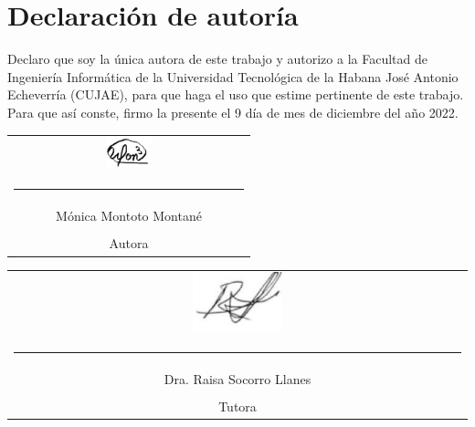 \chapter*{Declaración de autoría}

Declaro que soy la única autora de este trabajo y autorizo a la Facultad de Ingeniería Informática de la Universidad Tecnológica de la Habana José Antonio Echeverría (CUJAE), para que haga el uso que estime pertinente de este trabajo. Para que así conste, firmo la presente el 9 día de mes de diciembre del año 2022.

\vspace{1.5cm}

\begingroup	
\setlength{\tabcolsep}{10pt} %
\renewcommand{\arraystretch}{0.5} %

\begin{tabular}{c}
	\includegraphics[width=0.2\textwidth]{imagen/firma.png}\\
	\noindent\rule{6cm}{0.4pt} \\
	Mónica Montoto Montané \\
    \\
	Autora
\end{tabular}

\vspace{3cm}

\begin{tabular}{c}
	\includegraphics[width=0.2\textwidth]{imagen/raisa.png}\\
	\noindent\rule{6cm}{0.4pt}\\
	Dra. Raisa Socorro Llanes \\
	\\
	Tutora 
\end{tabular}
\endgroup

